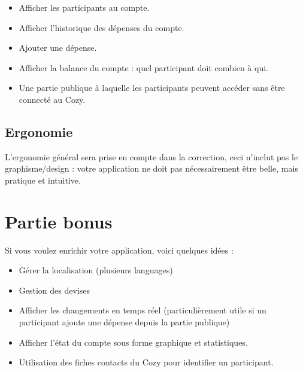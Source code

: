 \documentclass{42-fr}
\begin{document}
        \begin{itemize}\itemsep1pt
            \item Afficher les participants au compte.
            \item Afficher l'historique des d\'epenses du compte.
			\item Ajouter une d\'epense.
			\item Afficher la balance du compte : quel participant doit combien à qui.
	        \item Une partie publique \`a laquelle les participants peuvent acc\'eder sans 
				\^etre connect\'e au Cozy.
        \end{itemize}


    \section{Ergonomie}

        L'ergonomie g\'en\'eral sera prise en compte dans la correction,
		ceci n'inclut pas le graphisme/design : votre application ne doit
		pas n\'ecessairement \^etre belle, mais pratique et intuitive.
		



\chapter{Partie bonus}

    Si vous voulez enrichir votre application, voici quelques id\'ees :\newline

    \begin{itemize}\itemsep1pt
		\item Gérer la localisation (plusieurs languages)
        \item Gestion des devises
		\item Afficher les changements en temps r\'eel (particuli\`erement utile si
			un participant ajoute une d\'epense depuis la partie publique)
		\item Afficher l'\'etat du compte sous forme graphique et statistiques.
		\item Utilisation des fiches contacts du Cozy pour identifier un participant.
    \end{itemize}
\end{document}
